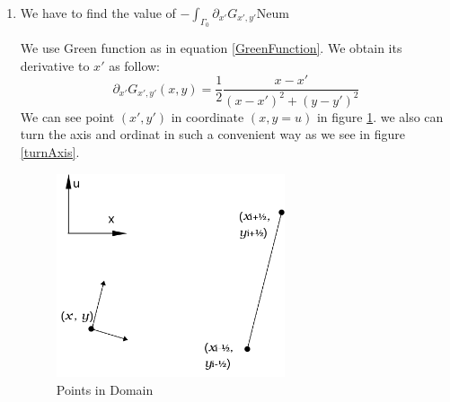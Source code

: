 \documentclass[a4paper,12pt]{article}
\newcommand{\integ}[3]{%
\ensuremath{\displaystyle{\int^{#2}_{#1} #3}}}
\begin{document}
\begin{enumerate}
 \item We have to find the value of $-\integ{\Gamma_0}{}{\partial_{x'} G_{x',y'} \text{Neum}}$

We use Green function as in equation \ref{GreenFunction}. We obtain its derivative to $x'$ as follow:
\begin{equation}
 \partial_{x'} G_{x',y'}(x,y)=\frac{1}{2}\frac{x-x'}{(x-x')^2+(y-y')^2}
\end{equation}
We can see point $(x',y')$ in coordinate $(x,y=u)$ in figure \ref{PointsDomain}. we also can turn the axis and ordinat in such a convenient way as we see in figure \ref{turnAxis}. 
\begin{figure}[!htbp]
\begin{center}
\includegraphics[height = 6cm]{positionOfPoints.png}
\end{center}
 \caption{Points in Domain}\label{PointsDomain}
\end{figure}


\end{enumerate}
\end{document}
